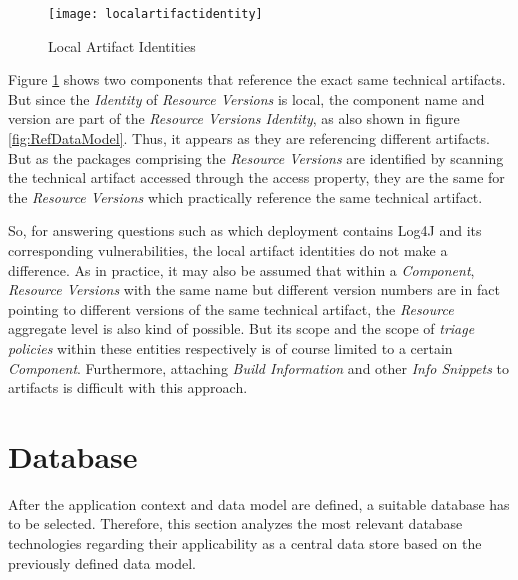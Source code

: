 \begin{figure}[H]
	\centering
	\texttt{[image: localartifactidentity]}
	\caption[Data Model]{Local Artifact Identities }
	\label{fig:LocalArtifactIdentity}
\end{figure}

Figure \ref{fig:LocalArtifactIdentity} shows two components that reference the exact same technical artifacts. But since the \emph{Identity} of \emph{Resource Versions} is local, the component name and version are part of the \emph{Resource Versions Identity}, as also shown in figure \ref{fig:RefDataModel}. Thus, it appears as they are referencing different artifacts. But as the packages comprising the \emph{Resource Versions} are identified by scanning the technical artifact accessed through the access property, they are the same for the \emph{Resource Versions} which practically reference the same technical artifact.\par 
So, for answering questions such as which deployment contains Log4J and its corresponding vulnerabilities, the local artifact identities do not make a difference. As in practice, it may also be assumed that within a \emph{Component}, \emph{Resource Versions} with the same name but different version numbers are in fact pointing to different versions of the same technical artifact, the \emph{Resource} aggregate level is also kind of possible. But its scope and the scope of \emph{triage policies} within these entities respectively is of course limited to a certain \emph{Component}. Furthermore, attaching \emph{Build Information} and other \emph{Info Snippets} to artifacts is difficult with this approach.


\section{Database}
After the application context and data model are defined, a suitable database has to be selected. Therefore, this section analyzes the most relevant database technologies regarding their applicability as a central data store based on the previously defined data model.

